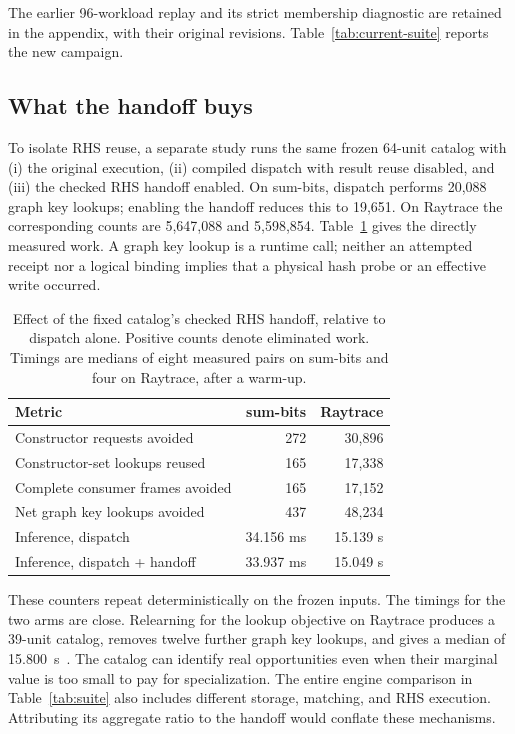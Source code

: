 \documentclass[10pt,letterpaper]{article}
\begin{document}





The earlier 96-workload replay and its strict membership diagnostic are retained in the appendix, with their original revisions. Table~\ref{tab:current-suite} reports the new campaign.

\subsection{What the handoff buys}
To isolate RHS reuse, a separate study runs the same frozen 64-unit catalog with (i) the original execution, (ii) compiled dispatch with result reuse disabled, and (iii) the checked RHS handoff enabled. On sum-bits, dispatch performs 20,088 graph key lookups; enabling the handoff reduces this to 19,651. On Raytrace the corresponding counts are 5,647,088 and 5,598,854. Table~\ref{tab:handoff} gives the directly measured work. A graph key lookup is a runtime call; neither an attempted receipt nor a logical binding implies that a physical hash probe or an effective write occurred.

\begin{table}[ht]
\centering
\caption{Effect of the fixed catalog's checked RHS handoff, relative to dispatch alone. Positive counts denote eliminated work. Timings are medians of eight measured pairs on sum-bits and four on Raytrace, after a warm-up.}
\label{tab:handoff}
\begin{tabular}{lrr}
\toprule
Metric & sum-bits & Raytrace\\
\midrule
Constructor requests avoided &272&30,896\\
Constructor-set lookups reused &165&17,338\\
Complete consumer frames avoided &165&17,152\\
Net graph key lookups avoided &437&48,234\\
\midrule
Inference, dispatch &34.156 ms&15.139 s\\
Inference, dispatch + handoff &33.937 ms&15.049 s\\
\bottomrule
\end{tabular}
\end{table}

These counters repeat deterministically on the frozen inputs. The timings for the two arms are close. Relearning for the lookup objective on Raytrace produces a 39-unit catalog, removes twelve further graph key lookups, and gives a median of 15.800~s~\cite{bakeartifact}. The catalog can identify real opportunities even when their marginal value is too small to pay for specialization. The entire engine comparison in Table~\ref{tab:suite} also includes different storage, matching, and RHS execution. Attributing its aggregate ratio to the handoff would conflate these mechanisms.
\end{document}
